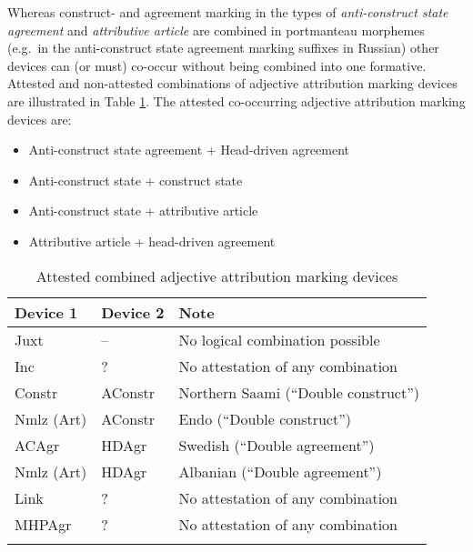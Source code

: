 Whereas construct- and agreement marking in the types of {\it anti-construct state agreement} and {\it attributive article} are combined in portmanteau morphemes (e.g.~in the anti-construct state agreement marking suffixes in Russian) other devices can (or must) co-occur without being combined into one formative. Attested and non-attested combinations of adjective attribution marking devices are illustrated in Table \ref{nichtkombiniert}.
The attested co-occurring adjective attribution marking devices are:
\begin{itemize}
\settowidth{}
\item Anti-construct state agreement + Head-driven agreement\\
\item Anti-construct state + construct state 					
\item Anti-construct state + attributive article 				
\item Attributive article + head-driven agreement 			
\end{itemize}
\begin{table}
\begin{tabular}{l | l | l}
\lsptoprule
Device 1 & Device 2 & Note\\
\midrule
Juxt & – & No logical combination possible\\
Inc & ? & No attestation of any combination\\ 
Constr &AConstr &  Northern Saami (“Double construct”)\\
Nmlz (Art) & AConstr & Endo (“Double construct”)\\
ACAgr  & HDAgr & Swedish (“Double agreement”)\\
Nmlz (Art)&HDAgr & Albanian (“Double agreement”)\\
Link & ? & No attestation of any combination\\
MHPAgr & ? & No attestation of any combination\\ 
\lspbottomrule
\end{tabular}
\caption[Attested combined devices]{Attested combined adjective attribution marking devices} \label{nichtkombiniert}
\end{table}

